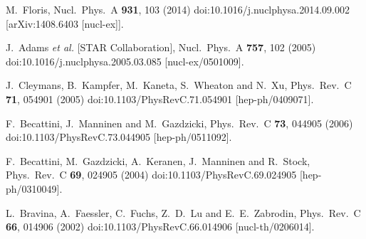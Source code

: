 \documentclass[12pt]{article}
\begin{document}
\begin{thebibliography}{99}
		
  M.~Floris,
  Nucl.\ Phys.\ A {\bf 931}, 103 (2014)
  doi:10.1016/j.nuclphysa.2014.09.002
  [arXiv:1408.6403 [nucl-ex]].
		
  J.~Adams {\it et al.} [STAR Collaboration],
  Nucl.\ Phys.\ A {\bf 757}, 102 (2005)
  doi:10.1016/j.nuclphysa.2005.03.085
  [nucl-ex/0501009].
	
  J.~Cleymans, B.~Kampfer, M.~Kaneta, S.~Wheaton and N.~Xu,
  Phys.\ Rev.\ C {\bf 71}, 054901 (2005)
  doi:10.1103/PhysRevC.71.054901
  [hep-ph/0409071].
	
  F.~Becattini, J.~Manninen and M.~Gazdzicki,
  Phys.\ Rev.\ C {\bf 73}, 044905 (2006)
  doi:10.1103/PhysRevC.73.044905
  [hep-ph/0511092].
	
  F.~Becattini, M.~Gazdzicki, A.~Keranen, J.~Manninen and R.~Stock,
  Phys.\ Rev.\ C {\bf 69}, 024905 (2004)
  doi:10.1103/PhysRevC.69.024905
  [hep-ph/0310049].

  L.~Bravina, A.~Faessler, C.~Fuchs, Z.~D.~Lu and E.~E.~Zabrodin,
  Phys.\ Rev.\ C {\bf 66}, 014906 (2002)
  doi:10.1103/PhysRevC.66.014906
  [nucl-th/0206014].
	

\end{thebibliography}
\end{document}
